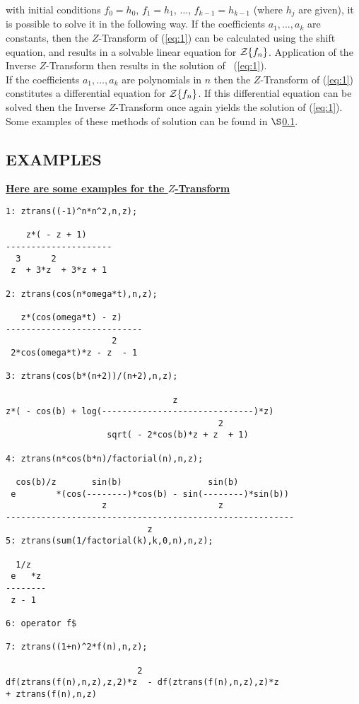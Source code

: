   with initial conditions
  $f_0 = h_0$, $f_1 = h_1$, $\ldots$, $f_{k-1} = h_{k-1}$ (where $h_j$
  are given), it is possible to solve it in the following way.
   If the coefficients $a_1, \ldots , a_k$ are constants, then the 
  $Z$-Transform of (\ref{eq:1}) can be calculated using the shift
  equation, and results in a solvable linear equation for 
  ${\cal Z} \{f_n\}$. Application of the Inverse $Z$-Transform
  then results in the solution of \ (\ref{eq:1}).\\
  If the coefficients $a_1, \ldots , a_k$ are polynomials in $n$ then
  the $Z$-Transform of (\ref{eq:1}) constitutes a differential
  equation for ${\cal Z} \{f_n\}$. If this differential equation can
  be solved then the Inverse $Z$-Transform once again yields the
  solution of (\ref{eq:1}).
  Some examples of these methods of solution can be found in
  $\S$\ref{ztranssec:Examples}.

\subsection{EXAMPLES}
\label{ztranssec:Examples}
\underline {{\bf Here are some examples for the $Z$-Transform}}
\begin{verbatim}
1: ztrans((-1)^n*n^2,n,z);

    z*( - z + 1)
---------------------
  3      2
 z  + 3*z  + 3*z + 1

2: ztrans(cos(n*omega*t),n,z);

   z*(cos(omega*t) - z)
---------------------------
                     2
 2*cos(omega*t)*z - z  - 1

3: ztrans(cos(b*(n+2))/(n+2),n,z);

                                 z
z*( - cos(b) + log(------------------------------)*z)
                                          2
                    sqrt( - 2*cos(b)*z + z  + 1)

4: ztrans(n*cos(b*n)/factorial(n),n,z);

  cos(b)/z       sin(b)                 sin(b)
 e        *(cos(--------)*cos(b) - sin(--------)*sin(b))
                   z                      z
---------------------------------------------------------
                            z
5: ztrans(sum(1/factorial(k),k,0,n),n,z);

  1/z
 e   *z
--------
 z - 1

6: operator f$

7: ztrans((1+n)^2*f(n),n,z);

                          2
df(ztrans(f(n),n,z),z,2)*z  - df(ztrans(f(n),n,z),z)*z 
+ ztrans(f(n),n,z)

\end{verbatim}

